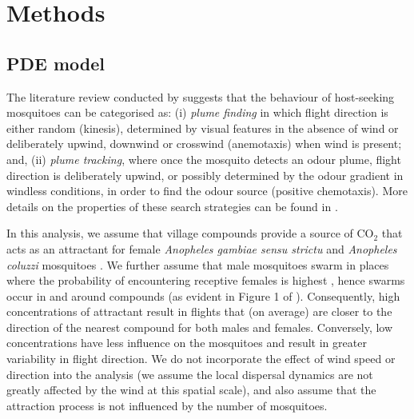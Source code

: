 \documentclass[]{bmcart}
\providecommand{\DIFaddtex}[1]{{\protect\color{blue}\uwave{#1}}} %
\providecommand{\DIFaddbegin}{} %
\providecommand{\DIFaddend}{} %
\providecommand{\DIFadd}[1]{\texorpdfstring{\DIFaddtex{#1}}{#1}} %
\newcommand{\DIFaddincludegraphics}[2][]{{\color{blue}\fbox{\DIFOincludegraphics[#1]{#2}}}} %
\DeclareRobustCommand{\DIFaddbegin}{\DIFOaddbegin \let\includegraphics\DIFaddincludegraphics} %
\DeclareRobustCommand{\DIFaddend}{\DIFOaddend \let\includegraphics\DIFOincludegraphics} %
\begin{document}
\section{Methods}

\subsection{PDE model}

The literature review conducted by \cite{Cummins2012} suggests that the behaviour of host-seeking mosquitoes can be categorised as: (i) \emph{plume finding} in which flight direction is either random (kinesis), determined by visual features in the absence of wind or deliberately upwind, downwind or crosswind (anemotaxis) when wind is present; and, (ii) \emph{plume tracking}, where once the mosquito detects an odour plume, flight direction is deliberately upwind, or possibly determined by the odour gradient in windless conditions, in order to find the odour source (positive chemotaxis). More details on the properties of these search strategies can be found in \cite{Pasternak2009}. 

In this analysis, we assume that village compounds \DIFaddbegin \DIFadd{(houses) }\DIFaddend provide a source of CO$_2$ that acts as an attractant for female \emph{Anopheles gambiae sensu strictu} and \emph{Anopheles coluzzi} mosquitoes \cite{DeJong1995, Majeed2017}. We further assume that male mosquitoes swarm in places where the probability of encountering receptive females is highest \citep{Diabate2015}, hence swarms occur in and around compounds (as evident in Figure 1 of \citep[][]{Epopa2017}). Consequently, high concentrations of attractant result in flights that (on average) are closer to the direction of the nearest compound for both males and females. Conversely, low concentrations have less influence on the mosquitoes and result in greater variability in flight direction. We do not incorporate the effect of wind speed or direction into the analysis (we assume the local dispersal dynamics are not greatly affected by the wind at this spatial scale), and also assume that the attraction process is not influenced by the number of mosquitoes.
\end{document}
